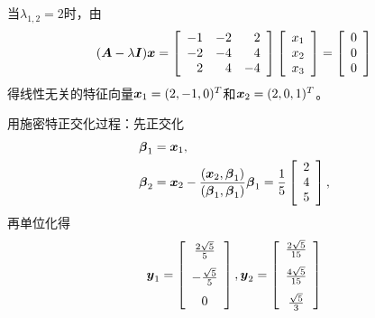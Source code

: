 \begin{frame}
  \begin{jie}
    当$\lambda_{1,2}=2$时，由
    $$
    (\boldsymbol{A}-\lambda\boldsymbol{I}){\boldsymbol{x}}=\left[
      \begin{array}{rrr}
        -1&-2&2\\
        -2&-4&4\\
        2&4&-4
      \end{array}
    \right]
    \left[
      \begin{array}{c}
        x_1\\
        x_2\\
        x_3
      \end{array}
    \right]=
    \left[
      \begin{array}{c}
        0\\
        0\\
        0
      \end{array}
    \right]
    $$
    得线性无关的特征向量${\boldsymbol{x}}_1=(2,-1,0)^T$和${\boldsymbol{x}}_2=(2,0,1)^T$。 \pause 
    
    用施密特正交化过程：先正交化
    $$
    \begin{aligned}
      \boldsymbol{\beta}_1&={\boldsymbol{x}}_1,\\
      \boldsymbol{\beta}_2&={\boldsymbol{x}}_2-\frac{({\boldsymbol{x}}_2,\boldsymbol{\beta}_1)}{(\boldsymbol{\beta}_1,\boldsymbol{\beta}_1)}\boldsymbol{\beta}_1=\frac15\left[
      \begin{array}{c}
        2\\
        4\\
        5
      \end{array}
    \right],\\
    \end{aligned}
    $$
    再单位化得
    $$
    {\boldsymbol{y}}_1=\left[
      \begin{array}{c}
        \frac{2\sqrt5}5\\[.1in]
        -\frac{\sqrt 5}5\\[.1in]
        0
      \end{array}
    \right],
    {\boldsymbol{y}}_2=\left[
      \begin{array}{c}
        \frac{2\sqrt5}{15}\\[.1in]
        \frac{4\sqrt5}{15}\\[.1in]
        \frac{\sqrt5}3
      \end{array}
    \right]
    $$
  \end{jie}
\end{frame}


